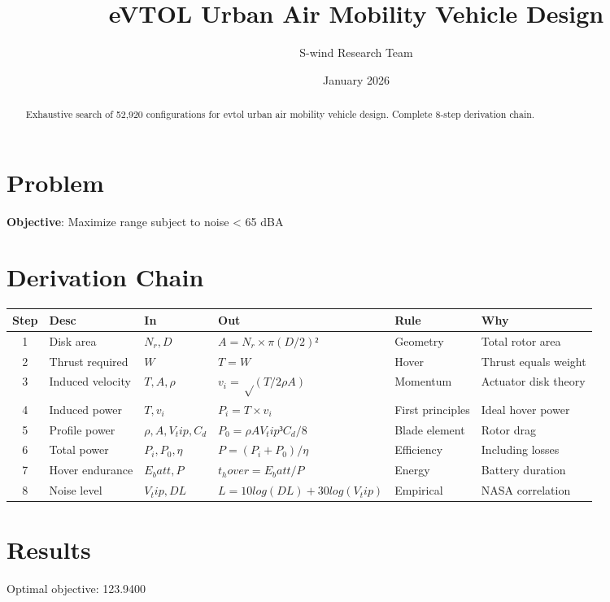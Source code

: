 \documentclass[11pt]{article}
\title{eVTOL Urban Air Mobility Vehicle Design}
\author{S-wind Research Team}
\date{January 2026}
\begin{document}
\maketitle

\begin{abstract}
Exhaustive search of 52,920 configurations for evtol urban air mobility vehicle design. Complete 8-step derivation chain.
\end{abstract}

\section{Problem}
\textbf{Objective}: Maximize range subject to noise < 65 dBA

\section{Derivation Chain}
\begin{longtable}{|c|p{2cm}|p{2cm}|p{3cm}|p{2cm}|p{3cm}|}
\hline
Step & Desc & In & Out & Rule & Why\\\hline\endhead
1 & Disk area & $N_r, D$ & $A = N_r × π(D/2)²$ & Geometry & Total rotor area\\\hline
2 & Thrust required & $W$ & $T = W$ & Hover & Thrust equals weight\\\hline
3 & Induced velocity & $T, A, ρ$ & $v_i = √(T/2ρA)$ & Momentum & Actuator disk theory\\\hline
4 & Induced power & $T, v_i$ & $P_i = T × v_i$ & First principles & Ideal hover power\\\hline
5 & Profile power & $ρ, A, V_tip, C_d$ & $P_0 = ρA V_tip³ C_d/8$ & Blade element & Rotor drag\\\hline
6 & Total power & $P_i, P_0, η$ & $P = (P_i + P_0)/η$ & Efficiency & Including losses\\\hline
7 & Hover endurance & $E_batt, P$ & $t_hover = E_batt / P$ & Energy & Battery duration\\\hline
8 & Noise level & $V_tip, DL$ & $L = 10log(DL) + 30log(V_tip)$ & Empirical & NASA correlation\\\hline
\end{longtable}

\section{Results}
Optimal objective: 123.9400
\end{document}
